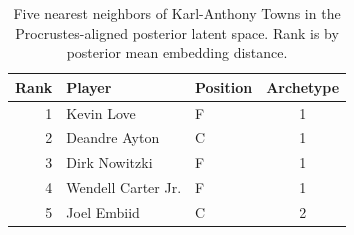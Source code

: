 \begin{table}[htbp]
  \centering\small
  \begin{tabular}{rllc}
    \toprule
    Rank & Player & Position & Archetype \\
    \midrule
    1 & Kevin Love & F & 1 \\
    2 & Deandre Ayton & C & 1 \\
    3 & Dirk Nowitzki & F & 1 \\
    4 & Wendell Carter Jr. & F & 1 \\
    5 & Joel Embiid & C & 2 \\
    \bottomrule
  \end{tabular}
  \caption{Five nearest neighbors of Karl-Anthony Towns in the Procrustes-aligned posterior latent space. Rank is by posterior mean embedding distance.}
  \label{tab:Karl_Anthony_Towns_neighbors}
\end{table}

